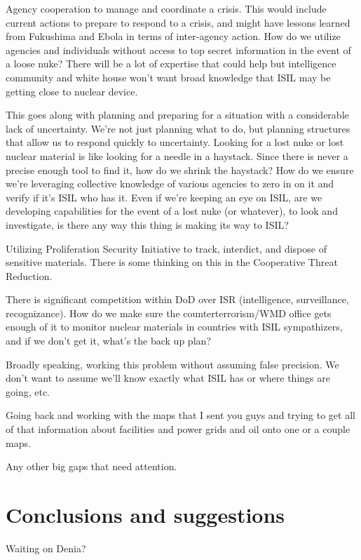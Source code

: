 \documentclass{report}
\begin{document}
Agency cooperation to manage and coordinate a crisis. This would include current actions to prepare to respond to a crisis, and might have lessons learned from Fukushima and Ebola in terms of inter-agency action. How do we utilize agencies and individuals without access to top secret information in the event of a loose nuke? There will be a lot of expertise that could help but intelligence community and white house won't want broad knowledge that ISIL may be getting close to nuclear device. 

This goes along with planning and preparing for a situation with a considerable lack of uncertainty. We're not just planning what to do, but planning structures that allow us to respond quickly to uncertainty. Looking for a lost nuke or lost nuclear material is like looking for a needle in a haystack. Since there is never a precise enough tool to find it, how do we shrink the haystack? How do we ensure we're leveraging collective knowledge of various agencies to zero in on it and verify if it's ISIL who has it. Even if we're keeping an eye on ISIL, are we developing capabilities for the event of a lost nuke (or whatever), to look and investigate, is there any way this thing is making its way to ISIL?

Utilizing Proliferation Security Initiative to track, interdict, and dispose of sensitive materials. There is some thinking on this in the Cooperative Threat Reduction.

There is significant competition within DoD over ISR (intelligence, surveillance, recognizance). How do we make sure the counterterrorism/WMD office gets enough of it to monitor nuclear materials in countries with ISIL sympathizers, and if we don't get it, what's the back up plan?

Broadly speaking, working this problem without assuming false precision. We don't want to assume we'll know exactly what ISIL has or where things are going, etc.

Going back and working with the maps that I sent you guys and trying to get all of that information about facilities and power grids and oil onto one or a couple maps. 

Any other big gaps that need attention.



\chapter{Conclusions and suggestions }

Waiting on Denia?
\end{document}
